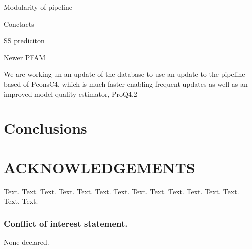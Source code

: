 \documentclass[a4,center,fleqn]{NAR}
\begin{document}
Modularity of pipeline


Conctacts

SS prediciton

Newer PFAM


We are working un an  update of the 
database to use an update to the pipeline based of PconsC4, which is
much faster enabling frequent updates as well as an improved model
quality estimator, ProQ4.2

\section{Conclusions}





\section{ACKNOWLEDGEMENTS}

Text. Text. Text. Text. Text. Text. Text. Text. Text. Text. Text.
Text. Text. Text. Text.


\subsubsection{Conflict of interest statement.} None declared.



\end{document}
